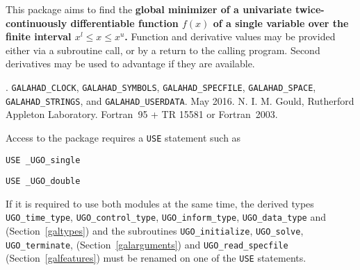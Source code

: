 \documentclass{galahad}
\newcommand{\packagename}{UGO}
\newcommand{\fullpackagename}{\libraryname\_\packagename}
\begin{document}
\galheader


\galsummary
This package aims to find the {\bf global minimizer of a univariate
twice-continuously differentiable function $f(x)$ of a single variable
over the finite interval $x^l \leq x \leq x^u$.} Function and derivative
values may be provided either via a subroutine call, or by a return
to the calling program. Second derivatives may be used to advantage if
they are available.


\galattributes
\galversions{\tt  \fullpackagename\_single, \fullpackagename\_double}.
\galuses
{\tt GALAHAD\_CLOCK},
{\tt GALAHAD\_SY\-M\-BOLS},
{\tt GALAHAD\_SPECFILE},
{\tt GALAHAD\_SPACE},
{\tt GALAHAD\_STRINGS},
and
{\tt GALAHAD\_USERDATA}.
\galdate May 2016.
\galorigin N. I. M. Gould, Rutherford Appleton Laboratory.
\gallanguage Fortran~95 + TR 15581 or Fortran~2003.


\galhowto


Access to the package requires a {\tt USE} statement such as

\medskip{}

\hspace{8mm} {\tt USE \fullpackagename\_single}

\medskip{}

\hspace{8mm} {\tt USE  \fullpackagename\_double}

\medskip

\noindent
If it is required to use both modules at the same time, the derived types
{\tt \packagename\_time\_\-type},
{\tt \packagename\_control\_type},
{\tt \packagename\_inform\_type},
{\tt \packagename\_data\_type}
and
(Section~\ref{galtypes})
and the subroutines
{\tt \packagename\_initialize},
{\tt \packagename\_\-solve},
{\tt \packagename\_terminate},
(Section~\ref{galarguments})
and
{\tt \packagename\_read\_specfile}
(Section~\ref{galfeatures})
must be renamed on one of the {\tt USE} statements.
\end{document}

